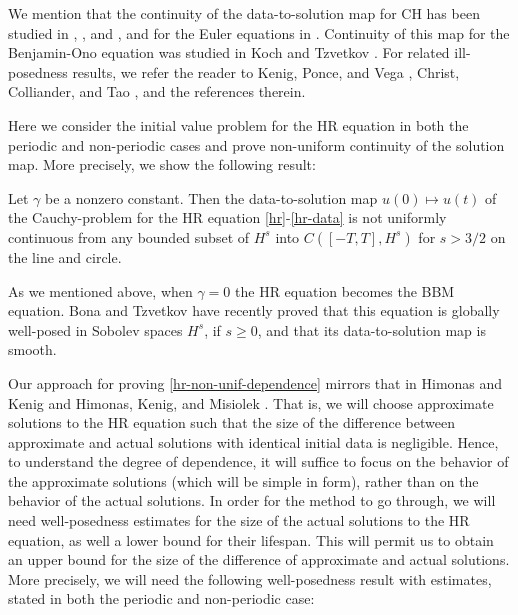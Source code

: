  We mention that the continuity of the data-to-solution map  for CH has 
 been studied in  \cite{Himonas_2007_Non-uniform-con},
 \cite{Himonas_2001_The-Cauchy-prob}, and 
 \cite{Himonas:2005kx}, and for the Euler equations in 
 \cite{Himonas_2009_Non-uniform-dep-euler}. Continuity of this map for  
 the  Benjamin-Ono equation was studied in  Koch and  Tzvetkov 
 \cite{Koch_2005_Nonlinear-wave-}. For related ill-posedness results, we 
 refer the reader to Kenig, Ponce, and  Vega 
 \cite{Kenig_2001_On-the-ill-pose}, Christ, Colliander, and Tao 
 \cite{Christ_2003_Asymptotics-fre}, and the references 
 therein.

Here we consider the initial value problem for the HR equation
in both the periodic and non-periodic cases
and prove non-uniform  continuity of the solution map. 
More precisely, we show the following result:
%
%
%
%
%
%
\begin{theorem}
\label{hr-non-unif-dependence}
Let $\gamma$ be a nonzero constant. Then 
the data-to-solution map $u(0) \mapsto u(t)$ of the Cauchy-problem
for the HR equation
\eqref{hr}-\eqref{hr-data}
is not uniformly continuous
from any bounded subset of  $H^s$ into $C([-T, T], H^s)$
for $s>3/2$ on the line and circle.
%
\end{theorem}
%
%
%
As we mentioned above, when  $\gamma=0$ the HR equation
 becomes the BBM equation.
 Bona and Tzvetkov \cite{Bona_2009_Sharp-well-pose} have recently proved  that this equation  
is globally well-posed in  Sobolev spaces $H^s$, if $s \ge 0$,
and that its data-to-solution map is smooth.

%
Our approach  for proving \cref{hr-non-unif-dependence}  
mirrors  that in Himonas and Kenig \cite{Himonas:2009fk} and 
Himonas, Kenig, and Misiolek \cite{Himonas_2009_Non-uniform-dep-per}.
That is, we will choose 
approximate solutions to the HR equation such that the size of the difference between approximate and actual solutions with 
identical initial data is negligible. Hence, to understand the degree of 
dependence, it will suffice to focus on the behavior of the approximate 
solutions (which will be simple in form), rather than on the behavior of the 
actual solutions. In order for the method to go through, we will 
need well-posedness estimates for  the size of the 
actual solutions to the HR equation, as well a 
lower bound for their lifespan. This will permit us to obtain an upper 
bound for the size of the difference of approximate and actual solutions. 
More precisely, we will need the following well-posedness result  with estimates,  
stated in both the  periodic and non-periodic case:


